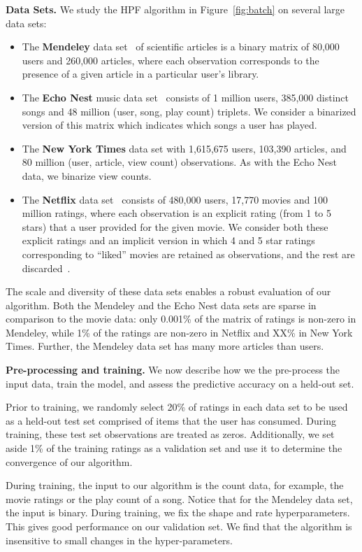 {\bf Data Sets.} We study the HPF algorithm in Figure~\ref{fig:batch}
on several large data sets:
\begin{itemize}
\item The {\bf Mendeley} data set~\cite{Jack:2010} of scientific
  articles is a binary matrix of 80,000 users and 260,000 articles,
  where each observation corresponds to the presence of a given
  article in a particular user's library.
\item The {\bf Echo Nest} music data set~\cite{Bertin-Mahieux:2011}
  consists of 1 million users, 385,000 distinct songs and 48 million
  (user, song, play count) triplets. We consider a binarized version
  of this matrix which indicates which songs a user has played.
\item The {\bf New York Times} data set with 1,615,675 users, 103,390
  articles, and 80 million (user, article, view count)
  observations. As with the Echo Nest data, we binarize view counts.
\item The {\bf Netflix} data set~\cite{Koren:2009} consists of 480,000
  users, 17,770 movies and 100 million ratings, where each observation
  is an explicit rating (from 1 to 5 stars) that a user provided for
  the given movie. We consider both these explicit ratings and an
  implicit version in which 4 and 5 star ratings corresponding to
  ``liked'' movies are retained as observations, and the rest are
  discarded~\cite{Paquet:2013p9197}.
\end{itemize}

The scale and diversity of these data sets enables a robust evaluation
of our algorithm. Both the Mendeley and the Echo Nest data sets are
sparse in comparison to the movie data: only 0.001\% of the matrix of
ratings is non-zero in Mendeley, while 1\% of the ratings are non-zero
in Netflix and XX\% in New York Times. Further, the Mendeley data set has
many more articles than users.


{\bf Pre-processing and training.} We now describe how we the
pre-process the input data, train the model, and assess the predictive
accuracy on a held-out set.

Prior to training, we randomly select 20\% of ratings in each data set
to be used as a held-out test set comprised of items that the user
has consumed. During training, these test set observations are treated
as zeros. Additionally, we set aside 1\% of the training ratings as a
validation set and use it to determine the convergence of our
algorithm.

During training, the input to our algorithm is the count data, for
example, the movie ratings or the play count of a song. Notice that
for the Mendeley data set, the input is binary. During training, we
fix the shape and rate hyperparameters. This gives good performance on
our validation set. We find that the algorithm is insensitive to small
changes in the hyper-parameters.

